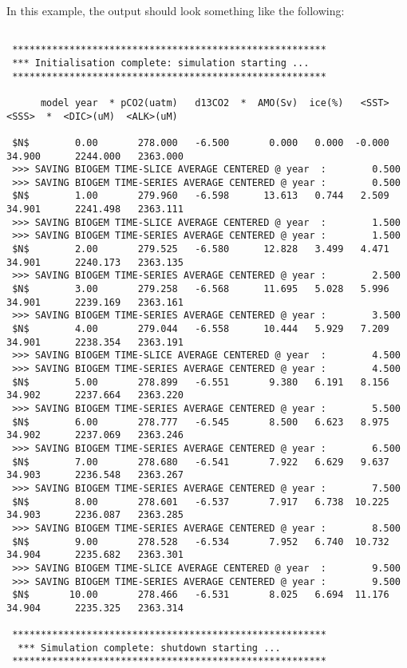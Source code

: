 \documentclass[11pt,fleqn]{book} %
\begin{document}
In this example, the output should look something like the following:

\newpage

\footnotesize
\begin{verbatim}

 *******************************************************
 *** Initialisation complete: simulation starting ...
 *******************************************************

      model year  * pCO2(uatm)   d13CO2  *  AMO(Sv)  ice(%)   <SST>   <SSS>  *  <DIC>(uM)  <ALK>(uM)

 $N$        0.00       278.000   -6.500       0.000   0.000  -0.000  34.900      2244.000   2363.000
 >>> SAVING BIOGEM TIME-SLICE AVERAGE CENTERED @ year  :        0.500
 >>> SAVING BIOGEM TIME-SERIES AVERAGE CENTERED @ year :        0.500
 $N$        1.00       279.960   -6.598      13.613   0.744   2.509  34.901      2241.498   2363.111
 >>> SAVING BIOGEM TIME-SLICE AVERAGE CENTERED @ year  :        1.500
 >>> SAVING BIOGEM TIME-SERIES AVERAGE CENTERED @ year :        1.500
 $N$        2.00       279.525   -6.580      12.828   3.499   4.471  34.901      2240.173   2363.135
 >>> SAVING BIOGEM TIME-SERIES AVERAGE CENTERED @ year :        2.500
 $N$        3.00       279.258   -6.568      11.695   5.028   5.996  34.901      2239.169   2363.161
 >>> SAVING BIOGEM TIME-SERIES AVERAGE CENTERED @ year :        3.500
 $N$        4.00       279.044   -6.558      10.444   5.929   7.209  34.901      2238.354   2363.191
 >>> SAVING BIOGEM TIME-SLICE AVERAGE CENTERED @ year  :        4.500
 >>> SAVING BIOGEM TIME-SERIES AVERAGE CENTERED @ year :        4.500
 $N$        5.00       278.899   -6.551       9.380   6.191   8.156  34.902      2237.664   2363.220
 >>> SAVING BIOGEM TIME-SERIES AVERAGE CENTERED @ year :        5.500
 $N$        6.00       278.777   -6.545       8.500   6.623   8.975  34.902      2237.069   2363.246
 >>> SAVING BIOGEM TIME-SERIES AVERAGE CENTERED @ year :        6.500
 $N$        7.00       278.680   -6.541       7.922   6.629   9.637  34.903      2236.548   2363.267
 >>> SAVING BIOGEM TIME-SERIES AVERAGE CENTERED @ year :        7.500
 $N$        8.00       278.601   -6.537       7.917   6.738  10.225  34.903      2236.087   2363.285
 >>> SAVING BIOGEM TIME-SERIES AVERAGE CENTERED @ year :        8.500
 $N$        9.00       278.528   -6.534       7.952   6.740  10.732  34.904      2235.682   2363.301
 >>> SAVING BIOGEM TIME-SLICE AVERAGE CENTERED @ year  :        9.500
 >>> SAVING BIOGEM TIME-SERIES AVERAGE CENTERED @ year :        9.500
 $N$       10.00       278.466   -6.531       8.025   6.694  11.176  34.904      2235.325   2363.314

 *******************************************************
  *** Simulation complete: shutdown starting ...
 *******************************************************

\end{verbatim}
\normalsize
\end{document}
